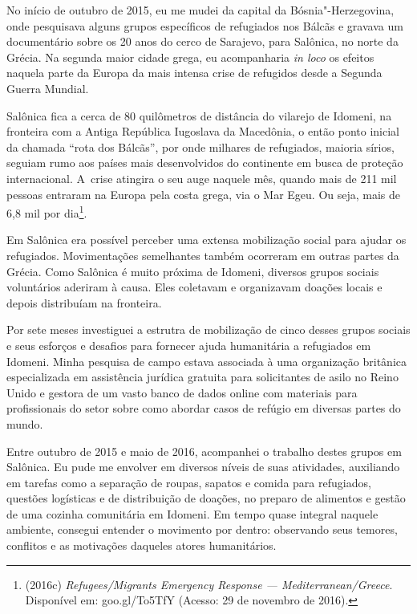 
\vspace{-2em}
No início de outubro de 2015, eu me mudei da capital da Bósnia"-Herzegovina, 
onde pesquisava alguns grupos específicos de refugiados nos Bálcãs e
gravava um documentário sobre os 20 anos do cerco de Sarajevo, para
Salônica, no norte da Grécia. Na segunda maior cidade grega, eu
acompanharia \textit{in loco} os efeitos naquela parte da Europa da mais
 intensa crise de refugidos desde a Segunda Guerra Mundial.

Salônica fica a cerca de 80 quilômetros de distância do vilarejo de
Idomeni, na fronteira com a Antiga República Iugoslava da Macedônia,
o então ponto inicial da chamada ``rota dos Bálcãs'', por onde milhares
de refugiados, maioria sírios, seguiam rumo aos países
mais desenvolvidos do continente em busca de proteção internacional. A~crise atingira o seu auge naquele mês, quando mais de 211 mil pessoas
entraram na Europa pela costa grega, via o Mar Egeu. Ou seja, mais de
6,8 mil por dia\footnote{ (2016c) \emph{Refugees/Migrants Emergency Response ---
Mediterranean/Greece}. Disponível em:
goo.gl/To5TfY (Acesso: 29 de
novembro de 2016).}.

Em Salônica era possível perceber uma extensa mobilização social para ajudar os
refugiados. Movimentações semelhantes também ocorreram em outras partes da
Grécia. Como Salônica é muito próxima de Idomeni, diversos grupos sociais
voluntários aderiram à causa. Eles coletavam e organizavam doações locais e
depois distribuíam na fronteira. 


Por sete meses investiguei a estrutra de mobilização de cinco desses grupos
sociais e seus esforços e desafios para fornecer
ajuda humanitária a refugiados em Idomeni. Minha pesquisa de campo
estava associada à uma organização britânica especializada em
assistência jurídica gratuita para solicitantes de asilo no Reino Unido
e gestora de um vasto banco de dados online com materiais para
profissionais do setor sobre como abordar casos de refúgio em diversas
partes do mundo.

Entre outubro de 2015 e maio de 2016, acompanhei o trabalho destes
grupos em Salônica. Eu pude me envolver em diversos níveis de suas atividades,
auxiliando em tarefas como a separação de roupas, sapatos e comida para
refugiados, questões logísticas e de distribuição de doações, no
preparo de alimentos e gestão de uma cozinha comunitária em Idomeni. Em
tempo quase integral naquele ambiente, consegui entender o movimento por
dentro: observando seus temores, conflitos e as motivações daqueles
atores humanitários.


